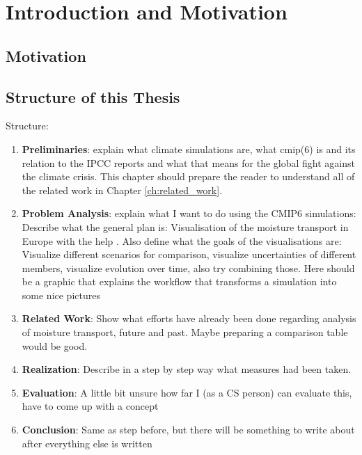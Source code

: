 \chapter{Introduction and Motivation}
\label{ch:introduction}


\section{Motivation}
\label{sec:motivation}





\section{Structure of this Thesis}

Structure:

\begin{enumerate}
  \item \textbf{Preliminaries}: explain what climate simulations are, what cmip(6) is and its relation to the IPCC reports and what that means for the global fight against the climate crisis. 
    This chapter should prepare the reader to understand all of the related work in Chapter \ref{ch:related_work}.
  \item \textbf{Problem Analysis}: explain what I want to do using the CMIP6 simulations: Describe what the general plan is: Visualisation of the moisture transport in Europe with the help . 
    Also define what the goals of the visualisations are: Visualize different scenarios for comparison, visualize uncertainties of different members, visualize evolution over time, also try combining those. 
    Here should be a graphic that explains the workflow that transforms a simulation into some nice pictures
  \item \textbf{Related Work}: Show what efforts have already been done regarding analysis of moisture transport, future and past. 
    Maybe preparing a comparison table would be good. 
  \item \textbf{Realization}: Describe in a step by step way what measures had been taken. 
  \item \textbf{Evaluation}: A little bit unsure how far I (as a CS person) can evaluate this, have to come up with a concept
  \item \textbf{Conclusion}: Same as step before, but there will be something to write about after everything else is written
  
\end{enumerate}
